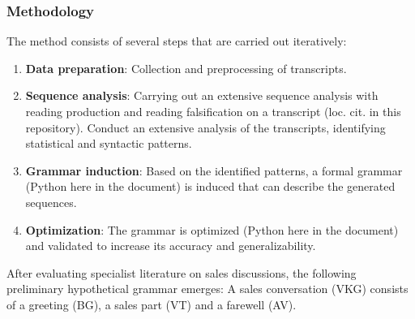 \documentclass[
]{article}
\begin{document}
\subsubsection{Methodology}\label{methodology}

The method consists of several steps that are carried out iteratively:

\begin{enumerate}
\def\labelenumi{\arabic{enumi}.}
\item
  \textbf{Data preparation}: Collection and preprocessing of
  transcripts.
\item
  \textbf{Sequence analysis}: Carrying out an extensive sequence
  analysis with reading production and reading falsification on a
  transcript (loc. cit. in this repository). Conduct an extensive
  analysis of the transcripts, identifying statistical and syntactic
  patterns.
\item
  \textbf{Grammar induction}: Based on the identified patterns, a formal
  grammar (Python here in the document) is induced that can describe the
  generated sequences.
\item
  \textbf{Optimization}: The grammar is optimized (Python here in the
  document) and validated to increase its accuracy and generalizability.
\end{enumerate}

After evaluating specialist literature on sales discussions, the
following preliminary hypothetical grammar emerges: A sales conversation
(VKG) consists of a greeting (BG), a sales part (VT) and a farewell
(AV).
\end{document}
